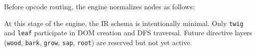 \begin{NxLightBox}[title={Normalization Rules}]
	\begin{NxLightP}
		Before opcode routing, the engine normalizes nodes as follows:
	\end{NxLightP}

	\begin{NxLightList}
	\end{NxLightList}
\end{NxLightBox}

\begin{NxLightBox}[title={Summary}]
	\begin{NxLightP}
		At this stage of the engine, the IR schema is intentionally minimal. Only \texttt{twig} and \texttt{leaf} participate in DOM creation and DFS traversal. Future directive layers (\texttt{wood}, \texttt{bark}, \texttt{grow}, \texttt{sap}, \texttt{root}) are reserved but not yet active.
	\end{NxLightP}
\end{NxLightBox}

